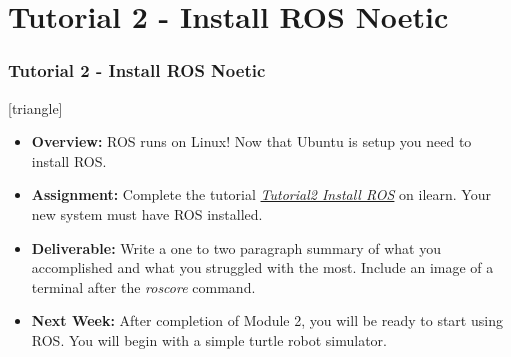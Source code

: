 \documentclass[fleqn]{beamer} %
\newcommand{\sectiontitleV}{Tutorial 2 - Install ROS Noetic}
\begin{document}
\section{\sectiontitleV}	
	            \begin{frame}[label=sectionV] \small
		\frametitle{\sectiontitleV}    
	
 [triangle]
                \begin{itemize}

					\item {\bf Overview:} ROS runs on Linux! Now that Ubuntu is setup you need to install ROS. 		

					\item {\bf Assignment:} Complete the tutorial \href{https://github.com/thillRobot/ros_workshop/blob/main/module2/tutorial2_install_ros/tutorial2_install_ros.md}{\it Tutorial2 Install ROS} on ilearn. Your new system must have ROS \rosdistro \hspace{1mm} installed.
                    
                    \item {\bf Deliverable:} Write a one to two paragraph summary of what you accomplished and what you struggled with the most. Include an image of a terminal after the {\it roscore} command. 
    
                    \item {\bf Next Week:} After completion of Module 2, you will be ready to start using ROS. You will begin with a simple turtle robot simulator. \vspc
                               
                \end{itemize}
		\end{frame}
\end{document}
